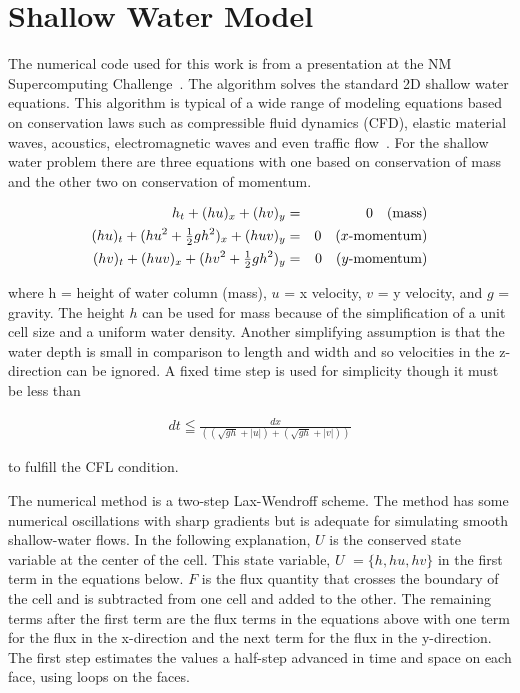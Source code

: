 \section{Shallow Water Model}
\label{sec:shallow-water}

The numerical code used for this work is from a presentation at the NM
Supercomputing Challenge~\citep{Robey07}.  The algorithm solves the
standard 2D shallow water equations. This algorithm is typical of a
wide range of modeling equations based on conservation laws such as
compressible fluid dynamics (CFD), elastic material waves, acoustics,
electromagnetic waves and even traffic flow~\citep{Leveque02}. For the
shallow water problem there are three equations with one based on
conservation of mass and the other two on conservation of momentum.

\begin{eqnarray*}
h_{t}+(hu)_{x}+(hv)_{y} & = & 0\quad\mbox{(mass)}\\
(hu)_{t}+(h{u}^{2}+\tfrac{1}{2}gh^{2})_{x}+(huv)_{y} & = & 0\mbox{\quad($x$-momentum)}\\
(hv)_{t}+(huv)_{x}+(h{v}^{2}+\tfrac{1}{2}gh^{2})_{y} & = & 0\mbox{\quad($y$-momentum)}
\end{eqnarray*}



\noindent
where h = height of water column (mass), $u$ = x velocity, $v$ =
y velocity, and $g$ = gravity. The height $h$ can be used for mass
because of the simplification of a unit cell size and a uniform water
density. Another simplifying assumption is that the water depth is
small in comparison to length and width and so velocities in the z-direction
can be ignored. A fixed time step is used for simplicity though it
must be less than

\begin{eqnarray*}
dt \leqq \frac{dx}{\left(\left(\sqrt{gh}+|u|\right) + \left(\sqrt{gh}+|v|\right)\right)}
\end{eqnarray*}

\noindent to fulfill the CFL condition.

The numerical method is a two-step Lax-Wendroff scheme. The method
has some numerical oscillations with sharp gradients but is adequate
for simulating smooth shallow-water flows. In the following explanation,
$U$ is the conserved state variable at the center of the cell. This
state variable, $U$ $=\{h,hu,hv\}$ in the first term in the equations
below. $F$ is the flux quantity that crosses the boundary of the cell
and is subtracted from one cell and added to the other. The remaining
terms after the first term are the flux terms in the equations above
with one term for the flux in the x-direction and the next term for
the flux in the y-direction. The first step estimates the values a
half-step advanced in time and space on each face, using loops on
the faces.

